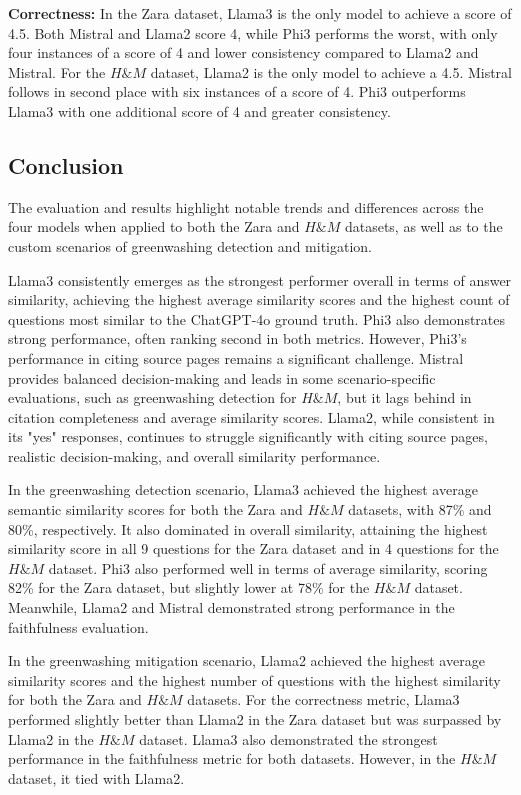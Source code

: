 \documentclass[]{article}
\begin{document}
\textbf{Correctness:}
In the Zara dataset, Llama3 is the only model to achieve a score of 4.5. Both Mistral and Llama2 score 4, while Phi3 performs the worst, with only four instances of a score of 4 and lower consistency compared to Llama2 and Mistral.  
For the $H\&M$ dataset, Llama2 is the only model to achieve a 4.5. Mistral follows in second place with six instances of a score of 4. Phi3 outperforms Llama3 with one additional score of 4 and greater consistency.

\subsection{Conclusion}
The evaluation and results highlight notable trends and differences across the four models when applied to both the Zara and $H\&M$ datasets, 
as well as to the custom scenarios of greenwashing detection and mitigation.

Llama3 consistently emerges as the strongest performer overall in terms of answer similarity, 
achieving the highest average similarity scores and the highest count of questions most similar to the ChatGPT-4o ground truth.
Phi3 also demonstrates strong performance, often ranking second in both metrics. 
However, Phi3’s performance in citing source pages remains a significant challenge. Mistral provides balanced decision-making and leads in some scenario-specific evaluations,
such as greenwashing detection for $H\&M$, but it lags behind in citation completeness and average similarity scores. Llama2, while consistent in its "yes" responses, continues to struggle significantly with citing source pages, realistic decision-making, and overall similarity performance.

In the greenwashing detection scenario, Llama3 achieved the highest average semantic similarity scores for both the Zara and $H\&M$ datasets, with 87\% and 80\%, respectively. It also dominated in overall similarity, attaining the highest similarity score in all 9 questions for the Zara dataset and in 4 questions for the $H\&M$ dataset.  
Phi3 also performed well in terms of average similarity, scoring 82\% for the Zara dataset, but slightly lower at 78\% for the $H\&M$ dataset. Meanwhile, Llama2 and Mistral demonstrated strong performance in the faithfulness evaluation.

In the greenwashing mitigation scenario, Llama2 achieved the highest average similarity scores and the highest number of questions with the highest similarity for both the Zara and $H\&M$ datasets.  
For the correctness metric, Llama3 performed slightly better than Llama2 in the Zara dataset but was surpassed by Llama2 in the $H\&M$ dataset.  
Llama3 also demonstrated the strongest performance in the faithfulness metric for both datasets. However, in the $H\&M$ dataset, it tied with Llama2.
\end{document}
